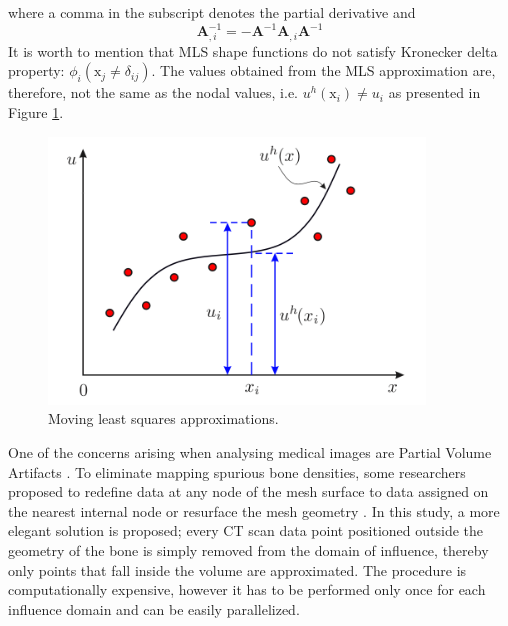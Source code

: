 \documentclass[11pt]{ACMEarticle}
\numberwithin{equation}{section}
\begin{document}
where a comma in the subscript denotes the partial derivative and 
\begin{equation}
\mathbf A_{,i}^{-1} = -\mathbf A^{-1} \mathbf A_{,i} \mathbf A^{-1}
\end{equation}
It is worth to mention that MLS shape functions do not satisfy Kronecker delta property: $\phi_i(\mathrm x_j \neq \delta_{ij}) $. The values obtained from the MLS approximation are, therefore, not the same as the nodal values, i.e. $u^h(\mathrm x_i) \neq u_i $ as presented in Figure \ref{fig:mwls_approxi}.
\begin{figure}[h!]
	\begin{centering}
		\includegraphics[width=10cm]{Figures/mwls_approxi}
		\caption{Moving least squares approximations.}
		\label{fig:mwls_approxi}
	\end{centering}
\end{figure}
One of the concerns arising when analysing medical images are Partial Volume Artifacts \citep{adams2009quantitative}. To eliminate mapping spurious bone densities, some researchers proposed to 
redefine data at any node of the mesh surface to data assigned on the nearest internal node \citep{helgason2008modified, chen2010new} or resurface the mesh geometry \citep{peleg2014can}. In this study, a more elegant solution is proposed; every CT scan data point positioned outside the geometry of the bone is simply removed from the domain of influence, thereby only points that fall inside the volume are approximated. 
The procedure is computationally expensive, however it has to be performed only once for each influence domain and can be easily parallelized. %
\end{document}
